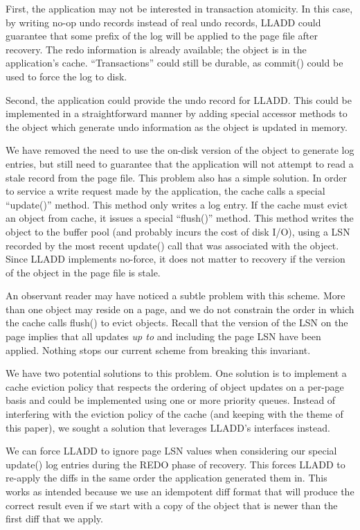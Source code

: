\documentclass[letterpaper,english]{article}
\begin{document}
First, the application may not be interested in transaction atomicity.
In this case, by writing no-op undo records instead of real undo
records, LLADD could guarantee that some prefix of the log will be
applied to the page file after recovery.  The redo information is
already available; the object is in the application's cache.
``Transactions'' could still be durable, as commit() could be used to
force the log to disk.

Second, the application could provide the undo record for LLADD.  This
could be implemented in a straightforward manner by adding special
accessor methods to the object which generate undo information as the
object is updated in memory.

We have removed the need to use the on-disk version of the object to
generate log entries, but still need to guarantee that the application
will not attempt to read a stale record from the page file.  This
problem also has a simple solution.  In order to service a write
request made by the application, the cache calls a special
``update()'' method.  This method only writes a log entry.  If the
cache must evict an object from cache, it issues a special ``flush()''
method.  This method writes the object to the buffer pool (and
probably incurs the cost of disk I/O), using a LSN recorded by the
most recent update() call that was associated with the object.  Since
LLADD implements no-force, it does not matter to recovery if the
version of the object in the page file is stale.

An observant reader may have noticed a subtle problem with this
scheme.  More than one object may reside on a page, and we do not
constrain the order in which the cache calls flush() to evict objects.
Recall that the version of the LSN on the page implies that all
updates {\em up to} and including the page LSN have been applied.
Nothing stops our current scheme from breaking this invariant.  

We have two potential solutions to this problem.  One solution is to
implement a cache eviction policy that respects the ordering of object
updates on a per-page basis and could be implemented using one or
more priority queues.  Instead of interfering with the eviction policy
of the cache (and keeping with the theme of this paper), we sought a
solution that leverages LLADD's interfaces instead.

We can force LLADD to ignore page LSN values when considering our
special update() log entries during the REDO phase of recovery.  This
forces LLADD to re-apply the diffs in the same order the application
generated them in.  This works as intended because we use an
idempotent diff format that will produce the correct result even if we
start with a copy of the object that is newer than the first diff that
we apply.
\end{document}
